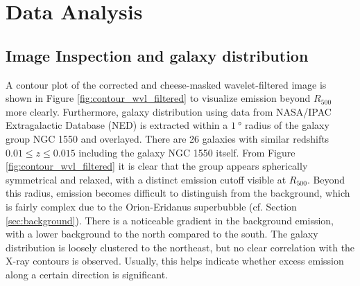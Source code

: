
\chapter{Data Analysis}
\label{sec:data_analysis}
\section{Image Inspection and galaxy distribution}\label{sec:image_inspection}
%
A contour plot of the corrected and cheese-masked wavelet-filtered image is shown in Figure \ref{fig:contour_wvl_filtered} to visualize emission beyond \(R_{500}\) more clearly. Furthermore, galaxy distribution using data from NASA/IPAC Extragalactic Database (NED) is extracted within a \(\SI{1}{\degree}\) radius of the galaxy group NGC 1550 and overlayed. There are 26 galaxies with similar redshifts \(0.01 \leq z \leq 0.015\) including the galaxy NGC 1550 itself. From Figure \ref{fig:contour_wvl_filtered} it is clear that the group appears spherically symmetrical and relaxed, with a distinct emission cutoff visible at \(R_{500}\). Beyond this radius, emission becomes difficult to distinguish from the background, which is fairly complex due to the Orion-Eridanus superbubble (cf. Section \ref{sec:background}). There is a noticeable gradient in the background emission, with a lower background to the north compared to the south. The galaxy distribution is loosely clustered to the northeast, but no clear correlation with the X-ray contours is observed. Usually, this helps indicate whether excess emission along a certain direction is significant.

